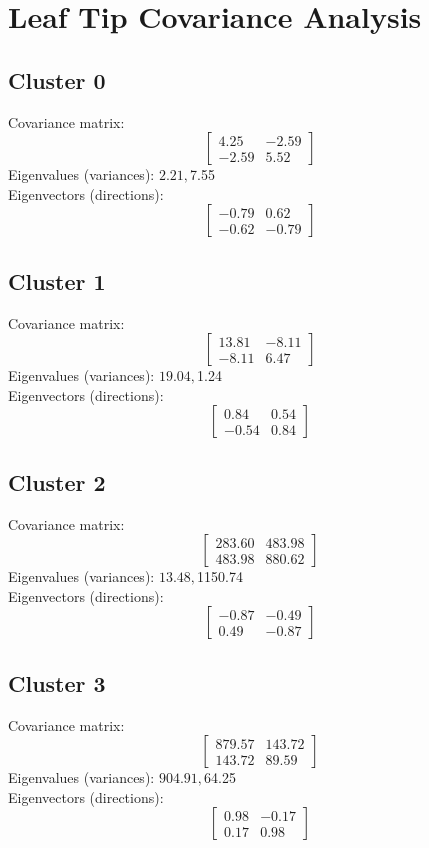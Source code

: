\documentclass{article}
\begin{document}
\section*{Leaf Tip Covariance Analysis}
\subsection*{Cluster 0}
Covariance matrix:
\[\begin{bmatrix}4.25 & -2.59 \\-2.59 & 5.52\end{bmatrix}\]
Eigenvalues (variances): $ 2.21, $7.55\\
Eigenvectors (directions):
\[\begin{bmatrix}-0.79 & 0.62 \\-0.62 & -0.79\end{bmatrix}\]
\subsection*{Cluster 1}
Covariance matrix:
\[\begin{bmatrix}13.81 & -8.11 \\-8.11 & 6.47\end{bmatrix}\]
Eigenvalues (variances): $ 19.04, $1.24\\
Eigenvectors (directions):
\[\begin{bmatrix}0.84 & 0.54 \\-0.54 & 0.84\end{bmatrix}\]
\subsection*{Cluster 2}
Covariance matrix:
\[\begin{bmatrix}283.60 & 483.98 \\483.98 & 880.62\end{bmatrix}\]
Eigenvalues (variances): $ 13.48, $1150.74\\
Eigenvectors (directions):
\[\begin{bmatrix}-0.87 & -0.49 \\0.49 & -0.87\end{bmatrix}\]
\subsection*{Cluster 3}
Covariance matrix:
\[\begin{bmatrix}879.57 & 143.72 \\143.72 & 89.59\end{bmatrix}\]
Eigenvalues (variances): $ 904.91, $64.25\\
Eigenvectors (directions):
\[\begin{bmatrix}0.98 & -0.17 \\0.17 & 0.98\end{bmatrix}\]
\end{document}
